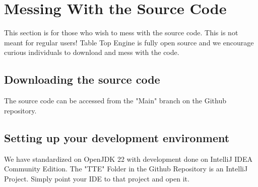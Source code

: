 \documentclass{article}
\begin{document}
\section{Messing With the Source Code}
This section is for those who wish to mess with the source code. This is not meant for regular users!
\break 
Table Top Engine is fully open source and we encourage curious individuals to download and mess with the code. 
\subsection{Downloading the source code}
The source code can be accessed from the "Main" branch on the Github repository.
\subsection{Setting up your development environment}
We have standardized on OpenJDK 22 with development done on IntelliJ IDEA Community Edition. The "TTE" Folder in the Github Repository is an IntelliJ Project. Simply point your IDE to that project and open it. 
\end{document}
